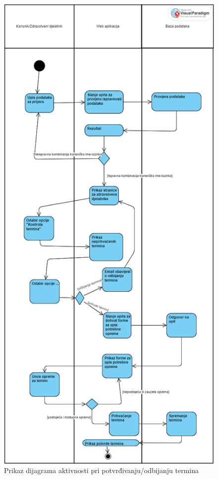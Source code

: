 			\begin{figure}[H]
				\includegraphics[scale=0.35]{slike/DijagramAktivnosti2.PNG} %
				\centering
				\caption{Prikaz dijagrama aktivnosti pri potvrđivanju/odbijanju termina}
				\label{fig:promjene}
			\end{figure}
			
